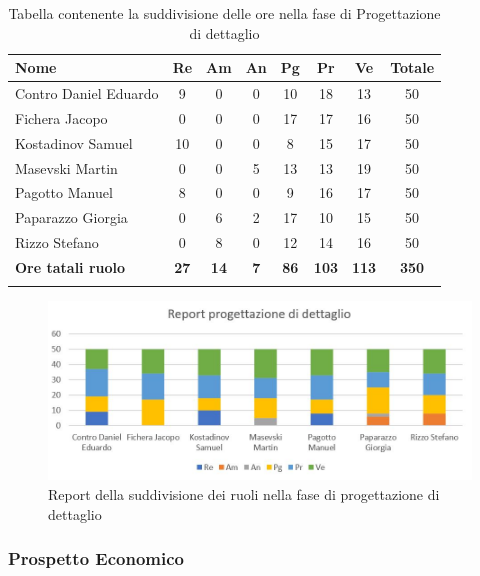 \documentclass[../piano_di_progetto.tex]{subfiles}
\begin{document}
\begin{center}
	\begin{longtable}{|l|c|c|c|c|c|c|c|}
		\hline
		\rowcolor{lightgray}
		\textbf{Nome} & \textbf{Re} & \textbf{Am} & \textbf{An} & \textbf{Pg}  & \textbf{Pr}   & \textbf{Ve} & \textbf{Totale} \\

		\hline
			Contro Daniel Eduardo & 9 & 0 & 0 & 10 & 18 & 13 & 50 \\
			Fichera Jacopo & 0 & 0 & 0 & 17 & 17 & 16 & 50 \\
			Kostadinov Samuel & 10 & 0 & 0 & 8 & 15 & 17 & 50 \\			
			Masevski Martin & 0 & 0 & 5 & 13 & 13 & 19 & 50 \\
			Pagotto Manuel & 8 & 0 & 0 & 9 & 16 & 17 & 50 \\		
			Paparazzo Giorgia & 0 & 6 & 2 & 17 & 10 & 15 & 50 \\
			Rizzo Stefano & 0 & 8 & 0 & 12 & 14 & 16 & 50 \\
			\hline
			\textbf{Ore tatali ruolo} & \textbf{27} & \textbf{14} & \textbf{7} & \textbf{86} & \textbf{103} & \textbf{113} & \textbf{350} \\
		\hline	
		\rowcolor{white}
		\caption{Tabella contenente la suddivisione delle ore nella fase di Progettazione di dettaglio}
	\end{longtable}
\end{center}

\begin{figure}[H]
\centering
\includegraphics[width=12cm]{src/img/report/report_prog_dett}
\caption{Report della suddivisione dei ruoli nella fase di progettazione di dettaglio}
\end{figure}

\subsubsection{Prospetto Economico}
\end{document}
